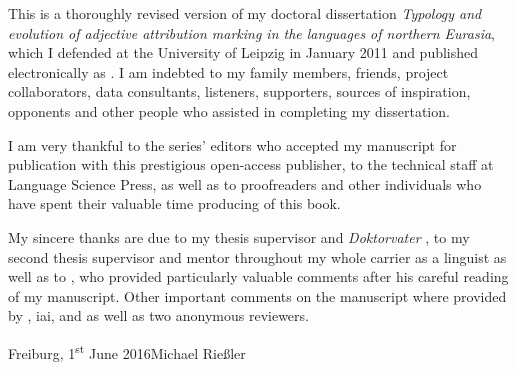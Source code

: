 

This is a thoroughly revised version of my doctoral dissertation \textit{Typology and evolution of adjective attribution marking in the languages of northern Eurasia}, which I defended at the University of Leipzig in January 2011 and published electronically as \citet{riesler2011a}. I am indebted to my family members, friends, project collaborators, data consultants, listeners, supporters, sources of inspiration, opponents and other people who assisted in completing my dissertation. 

I am very thankful to the series’ editors who accepted my manuscript for publication with this prestigious open-access publisher, to the technical staff at Language Science Press, as well as to proofreaders and other individuals who have spent their valuable time producing of this book. 

My sincere thanks are due to my thesis supervisor and \emph{Doktorvater} , to my second thesis supervisor and mentor throughout my whole carrier as a linguist  as well as to , who provided particularly valuable comments after his careful reading of my manuscript. Other important comments on the manuscript where provided by , iai,  and  as well as two anonymous reviewers.

\bigskip

\noindent
Freiburg, 1\textsuperscript{st} June 2016\hfill Michael Rießler
